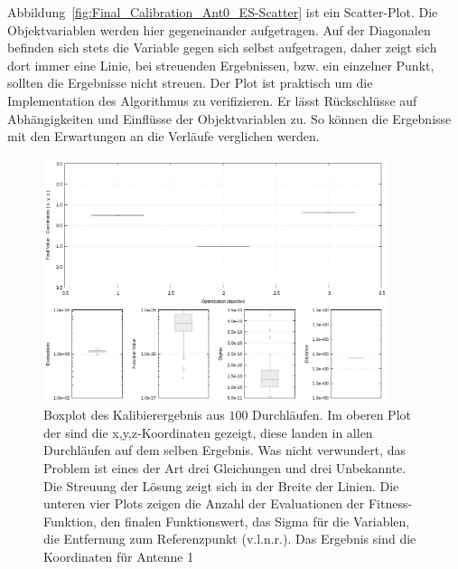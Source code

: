 Abbildung~\ref{fig:Final_Calibration_Ant0_ES-Scatter} ist ein Scatter-Plot. Die Objektvariablen werden hier gegeneinander aufgetragen. Auf der Diagonalen befinden sich stets die Variable gegen sich selbst aufgetragen, daher zeigt sich dort immer eine Linie, bei streuenden Ergebnissen, bzw. ein einzelner Punkt, sollten die Ergebnisse nicht streuen. Der Plot ist praktisch um die Implementation des Algorithmus zu verifizieren. Er lässt Rückschlüsse auf Abhängigkeiten und Einflüsse der Objektvariablen zu. So können die Ergebnisse mit den Erwartungen an die Verläufe verglichen werden.\\
%
%
\begin{figure}[!ht]
  \begin{center}
   \caption[Box-Plot der Endergebnisse der Kalibierung]{Boxplot des Kalibierergebnis aus $100$ Durchläufen. Im oberen Plot der sind die x,y,z-Koordinaten gezeigt, diese landen in allen Durchläufen auf dem selben Ergebnis. Was nicht verwundert, das Problem ist eines der Art drei Gleichungen und drei Unbekannte. Die Streuung der Lösung zeigt sich in der Breite der Linien. Die unteren vier Plots zeigen die Anzahl der Evaluationen der Fitness-Funktion, den finalen Funktionswert, das Sigma für die Variablen, die Entfernung zum Referenzpunkt (v.l.n.r.). Das Ergebnis sind die Koordinaten für Antenne 1}
    \label{fig:Final_Calibration_Ant0_ES-boxes}
    \includegraphics[width=0.9\textwidth]{img/calibration/calibration_ant0-boxes.png}
  \end{center}
 
%
\end{figure}
%
%
